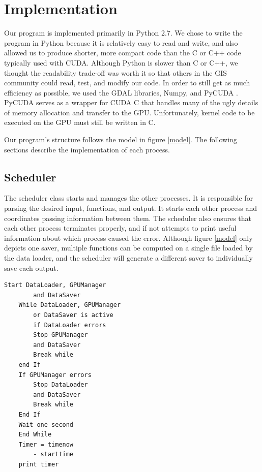 \documentclass[journal]{IEEEtran}
\begin{document}
\section{Implementation} \label{implementation}
    Our program is implemented primarily in Python 2.7. We chose to write the
    program in Python because it is relatively easy to read and write, and also
    allowed us to produce shorter, more compact code than the C or C++ code
    typically used with CUDA.  Although Python is slower than C or C++, we
    thought the readability trade-off was worth it so that others in the GIS
    community could read, test, and modify our code. In order to still get as
    much efficiency as possible, we used the GDAL libraries, Numpy, and PyCUDA
    \cite{pycuda_1} \cite{pycuda_2}. PyCUDA serves as a wrapper for CUDA C that
    handles many of the ugly details of memory allocation and transfer to the
    GPU. Unfortunately, kernel code to be executed on the GPU must still be
    written in C. 
    
    Our program's structure follows the model in figure \ref{model}. The
    following sections describe the implementation of each process.

    \subsection{Scheduler}
    The scheduler class starts and manages the other processes. It is
    responsible for parsing the desired input, functions, and output. It starts
    each other process and coordinates passing information between them. The
    scheduler also ensures that each other process terminates properly, and if
    not attempts to print useful information about which process caused the
    error. Although figure \ref{model} only depicts one saver, multiple
    functions can be computed on a single file loaded by the data loader, and
    the scheduler will generate a different saver to individually save each
    output.
    
    \begin{Verbatim}[frame=single, gobble=4]
    Start DataLoader, GPUManager
    	and DataSaver
    While DataLoader, GPUManager 
    	or DataSaver is active
    	if DataLoader errors
		Stop GPUManager 
		and DataSaver
		Break while
	end If
	If GPUManager errors
		Stop DataLoader 
		and DataSaver
		Break while
	End If
	Wait one second
    End While
    Timer = timenow 
    	- starttime
    print timer
    \end{Verbatim}
    \break
\end{document}
